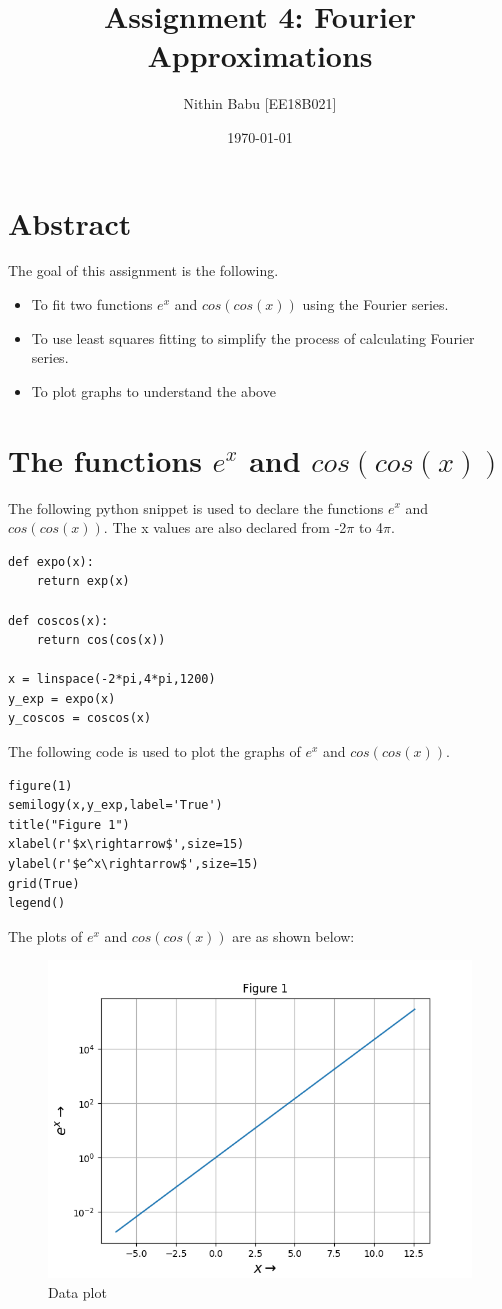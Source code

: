 \documentclass[11pt, a4paper]{article}
\title{Assignment 4: Fourier Approximations} %
\author{Nithin Babu [EE18B021]} %
\date{\today} %
\begin{document}
	
		
\maketitle %
\section*{Abstract}
The goal of this assignment is the following.
\begin{itemize}
\item To fit two functions $e^{x}$ and $cos(cos(x))$ using the Fourier series.
\item To use least squares fitting to simplify the process of calculating Fourier series.
\item To plot graphs to understand the above
\end{itemize}


\section{The functions $e^{x}$ and $cos(cos(x))$}
The following python snippet is used to declare the functions $e^{x}$ and $cos(cos(x))$. The x values are also declared from -2$\pi$ to 4$\pi$.

\begin{verbatim}
def expo(x):
    return exp(x)

def coscos(x):
    return cos(cos(x))
	
x = linspace(-2*pi,4*pi,1200)
y_exp = expo(x)
y_coscos = coscos(x)
\end{verbatim}

The following code is used to plot the graphs of $e^{x}$ and $cos(cos(x))$.
\begin{verbatim}
figure(1)
semilogy(x,y_exp,label='True')
title("Figure 1")
xlabel(r'$x\rightarrow$',size=15)
ylabel(r'$e^x\rightarrow$',size=15)
grid(True)
legend()
\end{verbatim}
The plots of $e^{x}$ and $cos(cos(x))$ are as shown below:
   \begin{figure}[!tbh]
   	\centering
   	\includegraphics[scale=0.6]{Figure_1.png}   
   	\caption{Data plot}
   	\label{fig:sample}
   \end{figure} 
   
\end{document}
